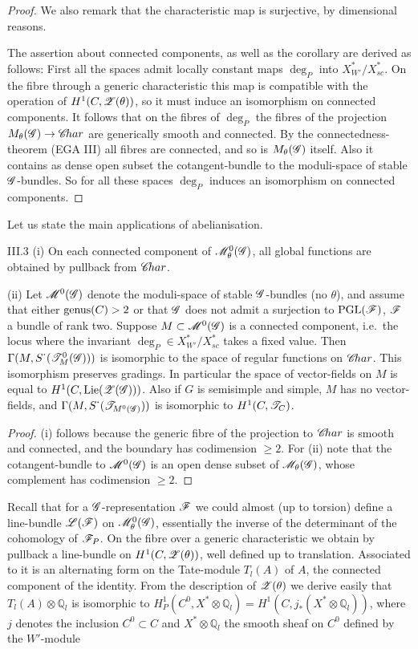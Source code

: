 \documentclass[12pt,english]{smfart}
\theoremstyle{plain} \newtheorem{innerthm}{Theorem} \newtheorem{innerlem}{Lemma} \newtheorem{innerprop}{Proposition} \newtheorem{innercor}{Corollary} \theoremstyle{definition} \newtheorem{innerdefn}{Definition} \newtheorem{innerconstr}{Construction} \theoremstyle{remark} \newtheorem*{remark}{Remark} \newtheorem*{remarks}{Remarks} \newtheorem*{applications}{Applications}
\begin{document}
\begin{proof}
We also remark that the characteristic map is surjective, by dimensional reasons.

The assertion about connected components, as well as the corollary are derived as follows: First all the spaces admit locally constant maps $\deg_P$ into $X^*_{W'}/X^*_{sc}$. On the fibre through a generic characteristic this map is compatible with the operation of $H^1(C,\mathscr{Z}(\theta))$, so it must induce an isomorphism on connected components. It follows that on the fibres of $\deg_P$ the fibres of the projection $M_\theta(\mathscr{G})\to\mathscr{C}\!har$ are generically smooth and connected. By the connectedness-theorem (EGA III) all fibres are connected, and so is $M_\theta(\mathscr{G})$ itself. Also it contains as dense open subset the cotangent-bundle to the moduli-space of stable $\mathscr{G}$-bundles. So for all these spaces $\deg_P$ induces an isomorphism on connected components.
\end{proof}

Let us state the main applications of abelianisation.

\begin{corollary}{III.3}\label{cor:III.3b}
(i) On each connected component of $\mathscr{M}^0_\theta(\mathscr{G})$, all global functions are obtained by pullback from $\mathscr{C}\!har$.

(ii) Let $\mathscr{M}^0(\mathscr{G})$ denote the moduli-space of stable $\mathscr{G}$-bundles (no $\theta$), and assume that either $\operatorname{genus}(C)>2$ or that $\mathscr{G}$ does not admit a surjection to $\mathrm{PGL}(\mathscr{F})$, $\mathscr{F}$ a bundle of rank two. Suppose $M\subset\mathscr{M}^0(\mathscr{G})$ is a connected component, i.e.\ the locus where the invariant $\deg_P\in X^*_{W'}/X^*_{sc}$ takes a fixed value. Then $\Gamma(M,S^{\textstyle\cdot}(\mathscr{T}^0_M(\mathscr{G})))$ is isomorphic to the space of regular functions on $\mathscr{C}\!har$. This isomorphism preserves gradings. In particular the space of vector-fields on $M$ is equal to $H^1(C,\operatorname{Lie}(\mathscr{Z}(\mathscr{G})))$. Also if $G$ is semisimple and simple, $M$ has no vector-fields, and $\Gamma(M,S^{\textstyle\cdot}(\mathscr{T}_{M^0(\mathscr{G})}))$ is isomorphic to $H^1(C,\mathscr{T}_C)$.
\end{corollary}

\begin{proof}
(i) follows because the generic fibre of the projection to $\mathscr{C}\!har$ is smooth and connected, and the boundary has codimension $\ge 2$. For (ii) note that the cotangent-bundle to $\mathscr{M}^0(\mathscr{G})$ is an open dense subset of $\mathscr{M}_\theta(\mathscr{G})$, whose complement has codimension $\ge 2$.
\end{proof}

Recall that for a $\mathscr{G}$-representation $\mathscr{F}$ we could almost (up to torsion) define a line-bundle $\mathscr{L}(\mathscr{F})$ on $\mathscr{M}^0_\theta(\mathscr{G})$, essentially the inverse of the determinant of the cohomology of $\mathscr{F}_P$. On the fibre over a generic characteristic we obtain by pullback a line-bundle on $H^1(C,\mathscr{Z}(\theta))$, well defined up to translation. Associated to it is an alternating form on the Tate-module $T_l(A)$ of $A$, the connected component of the identity. From the description of $\mathscr{Z}(\theta)$ we derive easily that $T_l(A)\otimes\mathbb{Q}_l$ is isomorphic to $H^1_P(C^0,X^*\otimes\mathbb{Q}_l)=H^1(C,j_*(X^*\otimes\mathbb{Q}_l))$, where $j$ denotes the inclusion $C^0\subset C$ and $X^*\otimes\mathbb{Q}_l$ the smooth sheaf on $C^0$ defined by the $W'$-module
\end{document}
